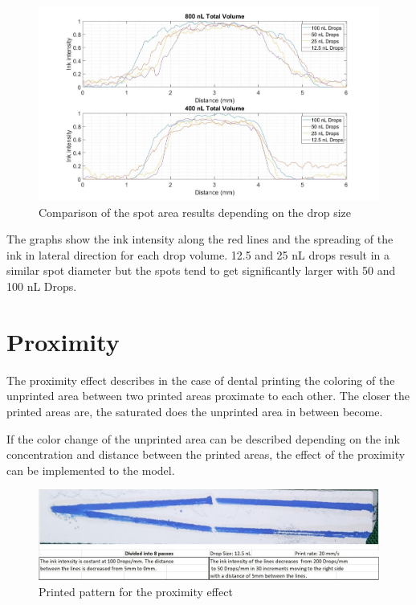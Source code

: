 \begin{figure}[H]
	\centering
	\includegraphics[width=1\textwidth]{grafiken/SpotArea.jpg}
	\caption{Comparison of the spot area results depending on the drop size}
	\label{fig:SpotArea}
\end{figure} 

\bigskip

The graphs show the ink intensity along the red lines and the spreading of the ink in lateral direction for each drop volume. 12.5 and 25 nL drops result in a similar spot diameter but the spots tend to get significantly larger with 50 and 100 nL Drops.

\section{Proximity}
The proximity effect describes in the case of dental printing the coloring of the unprinted area between two printed areas proximate to each other. The closer the printed areas are, the saturated does the unprinted area in between become.

If the color change of the unprinted area can be described depending on the ink concentration and distance between the printed areas, the effect of the proximity can be implemented to the model.

\bigskip

\begin{figure}[H]
	\centering
	\includegraphics[width=1\textwidth]{grafiken/proximityprint.jpg}
	\caption{Printed pattern for the proximity effect}
	\label{fig:proximityprint}
\end{figure} 

